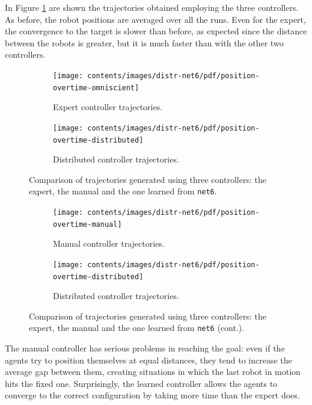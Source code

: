 In Figure \ref{fig:net6traj} are shown the trajectories obtained employing the 
three controllers. 
As before, the robot positions are averaged over all the runs. 
Even for the expert, the convergence to the target is slower than before, 
as expected since the distance between the robots is greater, but it is much faster 
than with the other two controllers.
\begin{figure}[!htb]
	\begin{center}
		\begin{subfigure}[h]{0.49\textwidth}
			\centering
			\texttt{[image: contents/images/distr-net6/pdf/position-overtime-omniscient]}%
			\caption{Expert controller trajectories.}
		\end{subfigure}
		\hfill
		\begin{subfigure}[h]{0.49\textwidth}
			\centering
			\texttt{[image: contents/images/distr-net6/pdf/position-overtime-distributed]}
			\caption{Distributed controller trajectories.}
		\end{subfigure}
	\end{center}
	\caption[Evaluation of the trajectories learned by 
	\texttt{net6}.]{Comparison of trajectories generated using three 
		controllers: the expert, the manual and the one learned from \texttt{net6}.}
\end{figure}
\medskip
\begin{figure}[!htb]\ContinuedFloat
	\centering
	\begin{subfigure}[h]{0.49\textwidth}
		\centering			
		\texttt{[image: contents/images/distr-net6/pdf/position-overtime-manual]}%
		\caption{Manual controller trajectories.}
	\end{subfigure}
	\hfill
	\begin{subfigure}[h]{0.49\textwidth}
		\centering
		\texttt{[image: contents/images/distr-net6/pdf/position-overtime-distributed]}
		\caption{Distributed controller trajectories.}
	\end{subfigure}
	\caption[]{Comparison 
		of trajectories generated using three controllers: the expert, the manual 
		and the one learned from \texttt{net6} (cont.).}
	\label{fig:net6traj}
\end{figure}
\noindent
The manual controller has serious problems in reaching the goal: even if the 
agents try to position themselves at equal distances, they tend to increase the 
average gap between them, creating situations in which the last robot in motion 
hits the fixed one. Surprisingly, the learned controller allows the agents to 
converge to the correct configuration by taking more time than the expert does.

